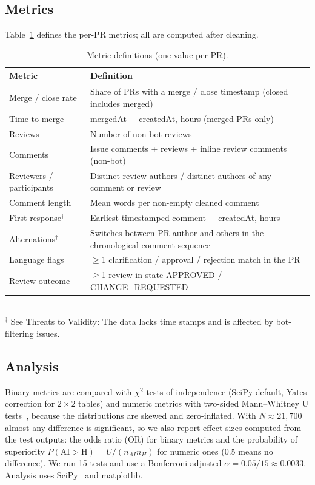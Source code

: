 \documentclass[conference]{IEEEtran}
\begin{document}
\subsection{Metrics}
Table~\ref{tab:metrics} defines the per-PR metrics; all are computed after cleaning.

\begin{table}[t]
\caption{Metric definitions (one value per PR).}
\label{tab:metrics}
\centering\small
\begin{tabular}{@{}p{0.95in}p{2.4in}@{}}
\toprule
Metric & Definition \\
\midrule
Merge / close rate & Share of PRs with a merge / close timestamp (closed includes merged) \\
Time to merge & mergedAt $-$ createdAt, hours (merged PRs only) \\
Reviews & Number of non-bot reviews \\
Comments & Issue comments + reviews + inline review comments (non-bot) \\
Reviewers / participants & Distinct review authors / distinct authors of any comment or review \\
Comment length & Mean words per non-empty cleaned comment \\
First response$^\dagger$ & Earliest timestamped comment $-$ createdAt, hours \\
Alternations$^\dagger$ & Switches between PR author and others in the chronological comment sequence \\
Language flags & $\geq$1 clarification / approval / rejection match in the PR \\
Review outcome & $\geq$1 review in state APPROVED / CHANGE\_REQUESTED\\
\bottomrule
\end{tabular}
\\[2pt]\footnotesize $^\dagger$ See Threats to Validity:  The data lacks time stamps and is affected by bot-filtering issues. 
\end{table}

\subsection{Analysis}
Binary metrics are compared with $\chi^2$ tests of independence (SciPy default, Yates correction for $2{\times}2$ tables) and numeric metrics with two-sided Mann--Whitney U tests~\cite{mannwhitney}, because the distributions are skewed and zero-inflated. With $N\approx 21{,}700$ almost any difference is significant, so we also report effect sizes computed from the test outputs: the odds ratio (OR) for binary metrics and the probability of superiority $P(\mathrm{AI}{>}\mathrm{H})=U/(n_{AI}n_{H})$ for numeric ones (0.5 means no difference). We run 15 tests and use a Bonferroni-adjusted $\alpha=0.05/15\approx0.0033$. Analysis uses SciPy~\cite{scipy} and matplotlib.
\end{document}
